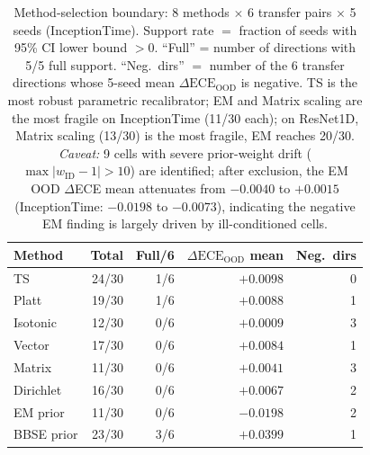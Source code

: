 \documentclass[review,12pt,nonatbib]{elsarticle}
\begin{document}
\begin{table}[t]
\centering
\caption{Method-selection boundary: 8 methods $\times$ 6 transfer pairs
$\times$ 5 seeds (InceptionTime). Support rate $=$ fraction of seeds
with 95\% CI lower bound $>0$. ``Full'' = number of directions with
5/5 full support. ``Neg.\ dirs'' $=$ number of the 6 transfer
directions whose 5-seed mean $\Delta\text{ECE}_{\text{OOD}}$ is
negative. TS is the most robust parametric recalibrator;
EM and Matrix scaling are the most fragile on InceptionTime
(11/30 each); on ResNet1D, Matrix scaling (13/30) is the most
fragile, EM reaches 20/30. \textit{Caveat:} 9 cells with severe
prior-weight drift ($\max |w_{\text{ID}}-1| > 10$) are identified;
after exclusion, the EM OOD $\Delta$ECE mean attenuates from
$-0.0040$ to $+0.0015$ (InceptionTime: $-0.0198$ to $-0.0073$),
indicating the negative EM finding is largely driven by
ill-conditioned cells.}
\label{tab:methods}
\footnotesize
\begin{tabular}{lrrrr}
\toprule
Method & Total & Full/6 & $\Delta\text{ECE}_{\text{OOD}}$ mean & Neg.\ dirs \\
\midrule
TS         & 24/30 & 1/6 & $+0.0098$ & 0 \\
Platt      & 19/30 & 1/6 & $+0.0088$ & 1 \\
Isotonic   & 12/30 & 0/6 & $+0.0009$ & 3 \\
Vector     & 17/30 & 0/6 & $+0.0084$ & 1 \\
Matrix     & 11/30 & 0/6 & $+0.0041$ & 3 \\
Dirichlet  & 16/30 & 0/6 & $+0.0067$ & 2 \\
EM prior   & 11/30 & 0/6 & $-0.0198$ & 2 \\
BBSE prior & 23/30 & 3/6 & $+0.0399$ & 1 \\
\bottomrule
\end{tabular}
\end{table}
\end{document}
